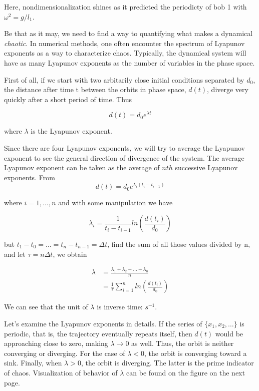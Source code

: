 \documentclass{article}
\begin{document}
Here, nondimensionalization shines as it predicted the periodicty of bob 1 with $\omega^2 = g/l_1$.

Be that as it may, we need to find a way to quantifying what makes a dynamical \textit{chaotic}. In numerical methods, one often encounter the spectrum of Lyapunov exponents as a way to characterize chaos. Typically, the dynamical system will have as many Lyapunov exponents as the number of variables in the phase space. 


First of all, if we start with two arbitarily close initial conditions separated by $d_0$, the distance after time t between the orbits in phase space, $d(t)$, diverge very quickly after a short period of time. Thus

\begin{equation} \label{1}
d(t) = d_0 e^{\lambda t}
\end{equation}

where $\lambda$ is the Lyapunov exponent.

Since there are four Lyapunov exponents, we will try to average the Lyapunov exponent to see the general direction of divergence of the system. The average Lyapunov exponent can be taken as the average of $nth$ successive Lyapunov exponents. From 
\begin{equation}
d(t) = d_0 e^{\lambda_i (t_i - t_{i-1})}
\end{equation}

where $i = 1, \ldots, n$ and with some manipulation we have

\begin{equation}
\lambda_i = \frac{1}{t_i - t_{i-1}}ln(\frac{d(t_i)}{d_0})
\end{equation}

but $t_1 - t_0 = \ldots = t_n - t_{n-1} = \Delta t$, find the sum of all those values divided by n, and let $\tau = n\Delta t$, we obtain

\begin{equation} \label{eq 5}
\begin{split}
\lambda &= \frac{\lambda_1 + \lambda_2 + \ldots + \lambda_n}{n} \\
		&= \frac{1}{\tau}\sum_{i=1}^{n}ln(\frac{d(t_i)}{d_0})
\end{split}
\end{equation}

We can see that the unit of $\lambda$ is inverse time: $s^{-1}$. 

Let's examine the Lyapunov exponents in details. If the series of $\{x_1, x_2, \ldots\}$ is periodic, that is, the trajectory eventually repeats itself, then $d(t)$ would be approaching close to zero, making $\lambda \rightarrow 0$ as well. Thus, the orbit is neither converging or diverging. For the case of $\lambda < 0$, the orbit is converging toward a sink. Finally, when $\lambda > 0$, the orbit is diverging. The latter is the prime indicator of chaos. Visualization of behavior of $\lambda$ can be found on the figure on the next page.
\end{document}
